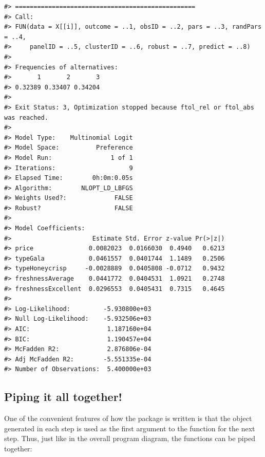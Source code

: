 \documentclass[
  12pt,
]{article}
\begin{document}
\begin{verbatim}
#> =================================================
#> Call:
#> FUN(data = X[[i]], outcome = ..1, obsID = ..2, pars = ..3, randPars = ..4, 
#>     panelID = ..5, clusterID = ..6, robust = ..7, predict = ..8)
#> 
#> Frequencies of alternatives:
#>       1       2       3 
#> 0.32389 0.33407 0.34204 
#> 
#> Exit Status: 3, Optimization stopped because ftol_rel or ftol_abs was reached.
#>                                 
#> Model Type:    Multinomial Logit
#> Model Space:          Preference
#> Model Run:                1 of 1
#> Iterations:                    9
#> Elapsed Time:        0h:0m:0.05s
#> Algorithm:        NLOPT_LD_LBFGS
#> Weights Used?:             FALSE
#> Robust?                    FALSE
#> 
#> Model Coefficients: 
#>                      Estimate Std. Error z-value Pr(>|z|)
#> price               0.0082023  0.0166030  0.4940   0.6213
#> typeGala            0.0461557  0.0401744  1.1489   0.2506
#> typeHoneycrisp     -0.0028889  0.0405808 -0.0712   0.9432
#> freshnessAverage    0.0441772  0.0404531  1.0921   0.2748
#> freshnessExcellent  0.0296553  0.0405431  0.7315   0.4645
#>                                      
#> Log-Likelihood:         -5.930800e+03
#> Null Log-Likelihood:    -5.932506e+03
#> AIC:                     1.187160e+04
#> BIC:                     1.190457e+04
#> McFadden R2:             2.876806e-04
#> Adj McFadden R2:        -5.551335e-04
#> Number of Observations:  5.400000e+03
\end{verbatim}

\hypertarget{piping-it-all-together}{%
\subsection{Piping it all together!}\label{piping-it-all-together}}

One of the convenient features of how the package is written is that the
object generated in each step is used as the first argument to the
function for the next step. Thus, just like in the overall program
diagram, the functions can be piped together:
\end{document}
